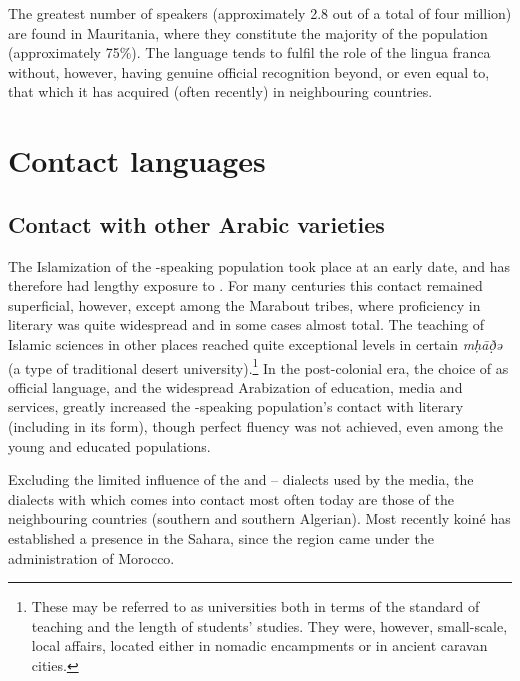 \documentclass[output=paper]{langsci/langscibook}
\begin{document}
The greatest number of  speakers (approximately 2.8 out of a total of four million) are found in Mauritania, where they constitute the majority of the population (approximately 75\%). The  language tends to fulfil the role of the lingua franca without, however, having genuine official recognition beyond, or even equal to, that which it has acquired (often recently) in neighbouring countries.

\section{Contact languages} %

\subsection{Contact with other Arabic varieties} %

The Islamization of the -speaking population took place at an early date, and  has therefore had lengthy exposure to  . For many centuries this contact remained superficial, however, except among the Marabout tribes, where proficiency in literary  was quite widespread and in some cases almost total. The teaching of Islamic sciences in other places reached quite exceptional levels in certain \textit{mḥāð̣ə{\R}} (a type of traditional desert university).\footnote{These may be referred to as universities both in terms of the standard of teaching and the length of students’ studies. They were, however, small-scale, local affairs, located either in nomadic encampments or in ancient caravan cities.} In the post-{colonial} era, the choice of  as official language, and the widespread {Arabization} of education, media and services, greatly increased the -speaking population’s contact with literary  (including in its  form), though perfect fluency was not achieved, even among the young and educated populations. 

Excluding the limited influence of the  and – dialects used by the media, the  dialects with which  comes into contact most often today are those of the neighbouring countries (southern  and southern Algerian). Most recently  koiné  has established a presence in the  Sahara, since the region came under the administration of Morocco.
\end{document}
